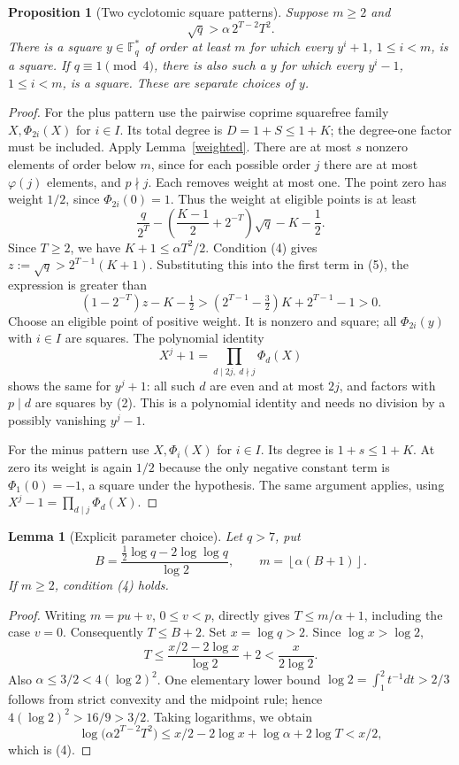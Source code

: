 \documentclass[11pt,a4paper]{article}
\newtheorem{lemma}[theorem]{Lemma}
\newtheorem{proposition}[theorem]{Proposition}
\newcommand{\F}{\mathbb F}
\begin{document}
\begin{proposition}[Two cyclotomic square patterns]\label{existence}
Suppose $m\ge2$ and
\[
 \sqrt q>\alpha\,2^{T-2}T^2. \tag{4}
\]
There is a square $y\in\F_q^*$ of order at least $m$ for which every
$y^i+1$, $1\le i<m$, is a square. If $q\equiv1\pmod4$, there is also
such a $y$ for which every $y^i-1$, $1\le i<m$, is a square.
These are separate choices of $y$.
\end{proposition}
\begin{proof}
For the plus pattern use the pairwise coprime squarefree family
$X,\Phi_{2i}(X)$ for $i\in I$. Its total degree is $D=1+S\le1+K$;
the degree-one factor must be included. Apply Lemma~\ref{weighted}.
There are at most $s$ nonzero elements of order below $m$, since for
each possible order $j$ there are at most $\varphi(j)$ elements, and
$p\nmid j$. Each removes weight at most one. The point zero has weight
$1/2$, since $\Phi_{2i}(0)=1$. Thus the weight at eligible points is at least
\[
 \frac q{2^T}-\left(\frac{K-1}2+2^{-T}\right)\sqrt q-K-\frac12.
 \tag{5}
\]
Since $T\ge2$, we have $K+1\le\alpha T^2/2$. Condition (4) gives
$z:=\sqrt q>2^{T-1}(K+1)$. Substituting this into the first term in
(5), the expression is greater than
\[
 (1-2^{-T})z-K-\tfrac12
 > (2^{T-1}-\tfrac32)K+2^{T-1}-1>0.
\]
Choose an eligible point of positive weight. It is nonzero and square;
all $\Phi_{2i}(y)$ with $i\in I$ are squares. The polynomial identity
\[
 X^j+1=\prod_{d\mid2j,\ d\nmid j}\Phi_d(X)
\]
shows the same for $y^j+1$: all such $d$ are even and at most $2j$,
and factors with $p\mid d$ are squares by (2). This is a polynomial
identity and needs no division by a possibly vanishing $y^j-1$.

For the minus pattern use $X,\Phi_i(X)$ for $i\in I$. Its degree is
$1+s\le1+K$. At zero its weight is again $1/2$ because the only negative
constant term is $\Phi_1(0)=-1$, a square under the hypothesis.
The same argument applies, using $X^j-1=\prod_{d\mid j}\Phi_d(X)$.
\end{proof}

\begin{lemma}[Explicit parameter choice]\label{parameter}
Let $q>7$, put
\[
 B=\frac{\frac12\log q-2\log\log q}{\log2},\qquad
 m=\left\lfloor\alpha(B+1)\right\rfloor.
\]
If $m\ge2$, condition (4) holds.
\end{lemma}
\begin{proof}
Writing $m=pu+v$, $0\le v<p$, directly gives $T\le m/\alpha+1$,
including the case $v=0$. Consequently $T\le B+2$.
Set $x=\log q>2$. Since $\log x>\log2$,
\[
 T\le\frac{x/2-2\log x}{\log2}+2<\frac{x}{2\log2}.
\]
Also $\alpha\le3/2<4(\log2)^2$. One elementary lower bound
$\log2=\int_1^2t^{-1}dt>2/3$ follows from strict convexity and the
midpoint rule; hence $4(\log2)^2>16/9>3/2$.
Taking logarithms, we obtain
\[
 \log\bigl(\alpha2^{T-2}T^2\bigr)
 \le x/2-2\log x+\log\alpha+2\log T<x/2,
\]
which is (4).
\end{proof}
\end{document}
